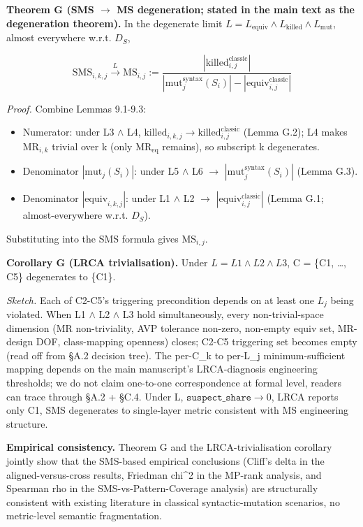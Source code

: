 \documentclass[manuscript,screen,review]{acmart}
\begin{document}
\textbf{Theorem G (SMS $\to$ MS degeneration; stated in the main text
as the degeneration theorem).} In the degenerate limit
$L = L_{\mathrm{equiv}} \wedge L_{\mathrm{killed}} \wedge L_{\mathrm{mut}}$, almost everywhere
w.r.t. $D_S$,

\[ \mathrm{SMS}_{i,k,j} \xrightarrow{L} \mathrm{MS}_{i,j} := \frac{|\mathrm{killed}_{i,j}^{\mathrm{classic}}|}{|\mathrm{mut}_j^{\mathrm{syntax}}(S_i)| - |\mathrm{equiv}_{i,j}^{\mathrm{classic}}|} \]

\emph{Proof.} Combine Lemmas 9.1-9.3:

\begin{itemize}

\item
  Numerator: under L3 $\wedge$ L4, $\mathrm{killed}_{i,k,j} \to
  \mathrm{killed}_{i,j}^{\mathrm{classic}}$ (Lemma G.2); L4 makes $\mathrm{MR}_{i,k}$ trivial
  over k (only $\mathrm{MR}_{\mathrm{eq}}$ remains), so subscript k degenerates.
\item
  Denominator $|\mathrm{mut}_j(S_i)|$: under L5 $\wedge$ L6 $\to$
  $|\mathrm{mut}_j^{\mathrm{syntax}}(S_i)|$ (Lemma G.3).
\item
  Denominator $|\mathrm{equiv}_{i,k,j}|$: under L1 $\wedge$ L2 $\to$
  $|\mathrm{equiv}_{i,j}^{\mathrm{classic}}|$ (Lemma G.1;
  almost-everywhere w.r.t. $D_S$).
\end{itemize}

Substituting into the SMS formula gives $\mathrm{MS}_{i,j}$.

\textbf{Corollary G (LRCA trivialisation).} Under $L = L1 \wedge L2 \wedge L3$, C
= \{C1, \ldots, C5\} degenerates to \{C1\}.

\emph{Sketch.} Each of C2-C5's triggering precondition depends on at
least one $L_j$ being violated. When L1 $\wedge$ L2 $\wedge$ L3 hold simultaneously,
every non-trivial-space dimension (MR non-triviality, AVP tolerance
non-zero, non-empty equiv set, MR-design DOF, class-mapping openness)
closes; C2-C5 triggering set becomes empty (read off from §A.2 decision
tree). The per-C\_k to per-L\_j minimum-sufficient mapping depends on
the main manuscript's LRCA-diagnosis engineering thresholds; we do not claim one-to-one
correspondence at formal level, readers can trace through §A.2 + §C.4.
Under L, $\texttt{suspect\_share} \to 0$, LRCA reports only C1, SMS degenerates to
single-layer metric consistent with \citet{d7c38286734419b52de4262c9802ebdfcf4b9447} MS engineering
structure.

\textbf{Empirical consistency.} Theorem G and the LRCA-trivialisation
corollary jointly
show that the SMS-based empirical conclusions (Cliff's delta in the aligned-versus-cross results,
Friedman chi\^{}2 in the MP-rank analysis, and Spearman rho in the SMS-vs-Pattern-Coverage analysis) are structurally consistent
with existing \citet{d7c38286734419b52de4262c9802ebdfcf4b9447} literature in classical
syntactic-mutation scenarios, no metric-level semantic fragmentation.
\end{document}
